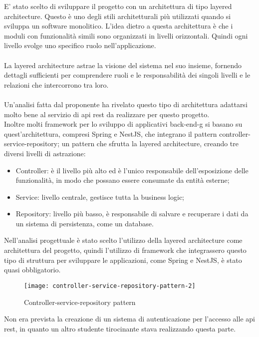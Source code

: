 E' stato scelto di sviluppare il progetto con un architettura di tipo layered architecture. Questo è uno
degli stili architetturali più utilizzati quando si sviluppa un software monolitico. L'idea dietro a 
questa architettura è che i moduli con funzionalità simili sono organizzati in livelli
orizzontali. Quindi ogni livello svolge uno specifico ruolo nell'applicazione.
\\\\
La layered architecture astrae la visione del sistema nel suo insieme, fornendo dettagli 
sufficienti per comprendere ruoli e le responsabilità dei singoli livelli e le relazioni
che intercorrono tra loro.
\\\\
Un'analisi fatta dal proponente ha rivelato questo tipo di architettura adattarsi molto bene al 
servizio di \gls{api} \gls{rest} da realizzare per questo progetto.
\\
Inoltre molti framework per lo sviluppo di applicativi \gls{back-end-g} si basano su quest'architettura, compresi
Spring e NestJS, che integrano il pattern controller-service-repository; un pattern
che sfrutta la layered architecture, creando tre diversi livelli di astrazione: 
\begin{itemize}
    \item Controller: è il livello più alto ed è l'unico responsabile dell'esposizione delle
        funzionalità, in modo che possano essere consumate da entità esterne;
    \item Service: livello centrale, gestisce tutta la business logic;
    \item Repository: livello più basso, è responsabile di salvare e recuperare i dati da un
        sistema di persistenza, come un database.
\end{itemize}
\leavevmode\newline
Nell'analisi progettuale è stato scelto l'utilizzo della layered architecture come architettura del progetto,
quindi l'utilizzo di framework che integrassero questo tipo di struttura per sviluppare le applicazioni, come 
Spring e NestJS, è stato quasi obbligatorio.
\leavevmode\newline
\begin{figure}[H]
    \centering
    \texttt{[image: controller-service-repository-pattern-2]}
    \caption{Controller-service-repository pattern}
\end{figure}
\leavevmode\newline
Non era prevista la creazione di un sistema di autenticazione per l'accesso alle \gls{api} \gls{rest}, in quanto 
un altro studente tirocinante stava realizzando questa parte.

